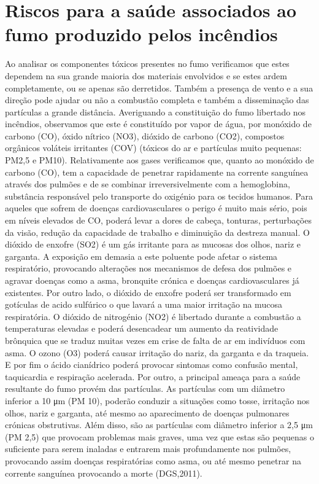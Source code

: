 \documentclass[a4paper,11pt]{report}
\begin{document}
\chapter{Riscos para a saúde associados ao fumo produzido pelos incêndios}
Ao analisar os componentes tóxicos presentes no fumo verificamos que estes dependem na sua grande maioria dos materiais envolvidos e se estes ardem completamente, ou se apenas são derretidos. Também a presença de vento e a sua direção pode ajudar ou não a combustão completa e também a disseminação das partículas a grande distância.
 Averiguando a constituição do fumo libertado nos incêndios, observamos que este é constituído por vapor de água, por monóxido de carbono (CO), óxido nítrico (NO3), dióxido de carbono (CO2), compostos orgânicos voláteis irritantes (COV) (tóxicos do ar e partículas muito pequenas: PM2,5 e PM10).
Relativamente aos gases verificamos que, quanto ao monóxido de carbono (CO), tem a capacidade de penetrar rapidamente na corrente sanguínea através dos pulmões e de se combinar irreversivelmente com a hemoglobina, substância responsável pelo transporte do oxigénio para os tecidos humanos. Para aqueles que sofrem de doenças cardiovasculares o perigo é muito mais sério, pois em níveis elevados de CO, poderá levar a dores de cabeça, tonturas, perturbações da visão, redução da capacidade de trabalho e diminuição da destreza manual.
O dióxido de enxofre (SO2) é um gás irritante para as mucosas dos olhos, nariz e garganta. A exposição em demasia a este poluente pode afetar o sistema respiratório, provocando alterações nos mecanismos de defesa dos pulmões e agravar doenças como a asma, bronquite crónica e doenças cardiovasculares já existentes. Por outro lado, o dióxido de enxofre poderá ser transformado em gotículas de acido sulfúrico o que lavará a uma maior irritação na mucosa respiratória.
O dióxido de nitrogénio (NO2) é libertado durante a combustão a temperaturas elevadas e poderá desencadear um aumento da reatividade brônquica que se traduz muitas vezes em crise de falta de ar em indivíduos com asma. 
O ozono (O3) poderá causar irritação do nariz, da garganta e da traqueia. E por fim o ácido cianídrico poderá provocar sintomas como confusão mental, taquicardia e respiração acelerada. 
Por outro, a principal ameaça para a saúde resultante do fumo provém das partículas. As partículas com um diâmetro inferior a 10 μm (PM 10), poderão conduzir a situações como tosse, irritação nos olhos, nariz e garganta, até mesmo ao aparecimento de doenças pulmonares crónicas obstrutivas. Além disso, são as partículas com diâmetro inferior a 2,5 μm (PM 2,5) que provocam problemas mais graves, uma vez que estas são pequenas o suficiente para serem inaladas e entrarem mais profundamente nos pulmões, provocando assim doenças respiratórias como asma, ou até mesmo penetrar na corrente sanguínea provocando a morte (DGS,2011).
\end{document}
